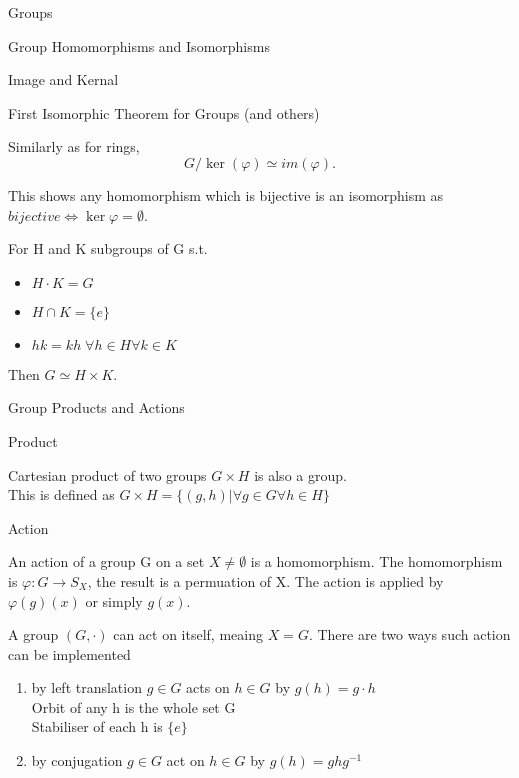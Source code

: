 \documentclass[12pt, letterpaper]{article}
\begin{document}
\begin{section}{Groups}
\begin{subsection}{Group Homomorphisms and Isomorphisms}
\begin{subsubsection}{Image and Kernal}
    \end{subsubsection}

    \begin{subsubsection}{First Isomorphic Theorem for Groups (and others)}

      Similarly as for rings, \[G / \ker(\varphi) \simeq im(\varphi).\]

      This shows any homomorphism which is bijective is an isomorphism as
      \(bijective \iff \ker{\varphi} = \emptyset\).

      For H and K subgroups of G s.t.
      \begin{itemize}
        \item \(H \cdot K = G\)
        \item \(H \cap K = \{ e \}\)
        \item \(hk = kh \; \forall h \in H \forall k \in K\)
      \end{itemize}
      Then \(G \simeq H \times K\).

    \end{subsubsection}

  \end{subsection}

  \begin{subsection}{Group Products and Actions}

    \begin{subsubsection}{Product}

      Cartesian product of two groups \(G \times H\) is also a group. \\
      This is defined as \(G \times H = \{ (g, h) | \forall g \in G \forall h \in H \}\)

    \end{subsubsection}

    \begin{subsubsection}{Action}

      An action of a group G on a set \(X \neq \emptyset\) is a homomorphism.
      The homomorphism is \(\varphi : G \to S_{X}\), the result is a permuation
      of X. The action is applied by \(\varphi(g)(x)\) or simply \(g(x)\).

      A group \((G, \cdot)\) can act on itself, meaing \(X = G\).  There are two
      ways such action can be implemented
      \begin{enumerate}
        \item by left translation \(g \in G\) acts on \(h \in G\) by
              \(g(h) = g \cdot h\) \\
              Orbit of any h is the whole set G \\
              Stabiliser of each h is \(\{ e \}\)
        \item by conjugation \(g \in G\) act on \(h \in G\) by
              \(g(h) = ghg^{-1}\)
      \end{enumerate}


\end{subsubsection}
\end{subsection}
\end{section}
\end{document}
